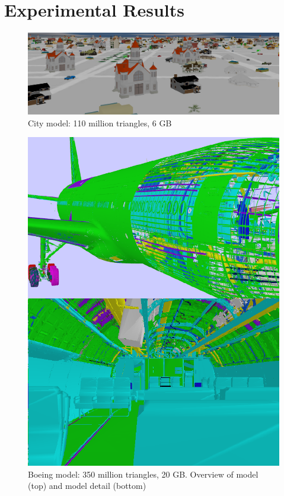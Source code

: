 
\section{Experimental Results}

\begin{figure}[ht]
  \centering
  \includegraphics[width=\columnwidth]{city.png}
  \caption{City model: 110 million triangles, 6 GB }
  \label{fig:model1}
\end{figure}

\begin{figure}[ht]
  \centering
  \includegraphics[width=\columnwidth]{BoeingModel.pdf}
  \caption{Boeing model: 350 million triangles, 20 GB. Overview of model (top) and model detail (bottom)}
  \label{fig:model2}
\end{figure}

